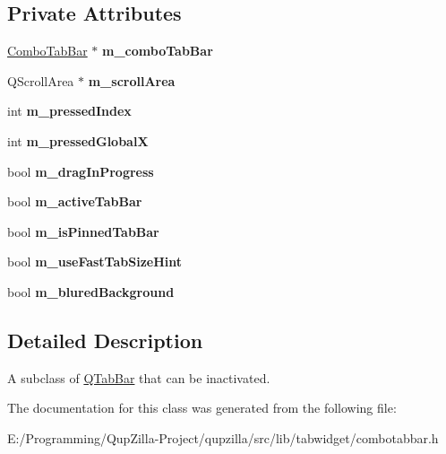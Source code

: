 \subsection*{Private Attributes}
\begin{DoxyCompactItemize}
\item 
\hypertarget{class_tab_bar_helper_ad68f4c55033fae83b4671f076fd125ea}{
\hyperlink{class_combo_tab_bar}{ComboTabBar} $\ast$ {\bfseries m\_\-comboTabBar}}
\label{class_tab_bar_helper_ad68f4c55033fae83b4671f076fd125ea}

\item 
\hypertarget{class_tab_bar_helper_a7f47562739959fffe6babbd3fcc5efbf}{
QScrollArea $\ast$ {\bfseries m\_\-scrollArea}}
\label{class_tab_bar_helper_a7f47562739959fffe6babbd3fcc5efbf}

\item 
\hypertarget{class_tab_bar_helper_afee6dac513266d8a3824abcddbcfc25d}{
int {\bfseries m\_\-pressedIndex}}
\label{class_tab_bar_helper_afee6dac513266d8a3824abcddbcfc25d}

\item 
\hypertarget{class_tab_bar_helper_a53e1c831d9bbde1fea5d98ee47c84dd3}{
int {\bfseries m\_\-pressedGlobalX}}
\label{class_tab_bar_helper_a53e1c831d9bbde1fea5d98ee47c84dd3}

\item 
\hypertarget{class_tab_bar_helper_ac38179f236f3afcd8d52b0001b7a270d}{
bool {\bfseries m\_\-dragInProgress}}
\label{class_tab_bar_helper_ac38179f236f3afcd8d52b0001b7a270d}

\item 
\hypertarget{class_tab_bar_helper_a33f915077d8a2413ba81dbc3dd9d255b}{
bool {\bfseries m\_\-activeTabBar}}
\label{class_tab_bar_helper_a33f915077d8a2413ba81dbc3dd9d255b}

\item 
\hypertarget{class_tab_bar_helper_a34ab815584444e6e90a7fd69ce8437db}{
bool {\bfseries m\_\-isPinnedTabBar}}
\label{class_tab_bar_helper_a34ab815584444e6e90a7fd69ce8437db}

\item 
\hypertarget{class_tab_bar_helper_aaa852e84f919925e9397c3f41d74985e}{
bool {\bfseries m\_\-useFastTabSizeHint}}
\label{class_tab_bar_helper_aaa852e84f919925e9397c3f41d74985e}

\item 
\hypertarget{class_tab_bar_helper_a62a14e7652bb52cef5c1dc4b2221d147}{
bool {\bfseries m\_\-bluredBackground}}
\label{class_tab_bar_helper_a62a14e7652bb52cef5c1dc4b2221d147}

\end{DoxyCompactItemize}


\subsection{Detailed Description}
A subclass of \hyperlink{class_q_tab_bar}{QTabBar} that can be inactivated. 

The documentation for this class was generated from the following file:\begin{DoxyCompactItemize}
\item 
E:/Programming/QupZilla-\/Project/qupzilla/src/lib/tabwidget/combotabbar.h\end{DoxyCompactItemize}
